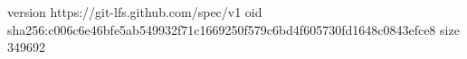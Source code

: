 version https://git-lfs.github.com/spec/v1
oid sha256:c006c6e46bfe5ab549932f71c1669250f579c6bd4f605730fd1648c0843efce8
size 349692
